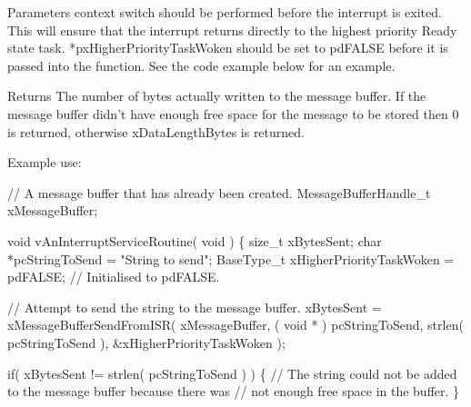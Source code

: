 \begin{DoxyPre}
\begin{DoxyPre}
\begin{DoxyParams}{Parameters}
   context switch should be performed before the interrupt is exited.  This will
   ensure that the interrupt returns directly to the highest priority Ready
   state task.  *pxHigherPriorityTaskWoken should be set to pdFALSE before it
   is passed into the function.  See the code example below for an example.\\
\hline
\end{DoxyParams}
\begin{DoxyReturn}{Returns}
The number of bytes actually written to the message buffer.  If the
   message buffer didn't have enough free space for the message to be stored
   then 0 is returned, otherwise xDataLengthBytes is returned.
\end{DoxyReturn}
Example use:

\begin{DoxyPre}
// A message buffer that has already been created.
MessageBufferHandle\_t xMessageBuffer;\end{DoxyPre}
\end{DoxyPre}
\end{DoxyPre}



\begin{DoxyPre}
\begin{DoxyPre}
\begin{DoxyPre}void vAnInterruptServiceRoutine( void )
\{
size\_t xBytesSent;
char *pcStringToSend = "String to send";
BaseType\_t xHigherPriorityTaskWoken = pdFALSE; // Initialised to pdFALSE.\end{DoxyPre}
\end{DoxyPre}
\end{DoxyPre}



\begin{DoxyPre}
\begin{DoxyPre}
\begin{DoxyPre}    // Attempt to send the string to the message buffer.
    xBytesSent = xMessageBufferSendFromISR( xMessageBuffer,
                                            ( void * ) pcStringToSend,
                                            strlen( pcStringToSend ),
                                            \&xHigherPriorityTaskWoken );\end{DoxyPre}
\end{DoxyPre}
\end{DoxyPre}



\begin{DoxyPre}
\begin{DoxyPre}
\begin{DoxyPre}    if( xBytesSent != strlen( pcStringToSend ) )
    \{
        // The string could not be added to the message buffer because there was
        // not enough free space in the buffer.
    \}\end{DoxyPre}
\end{DoxyPre}
\end{DoxyPre}



